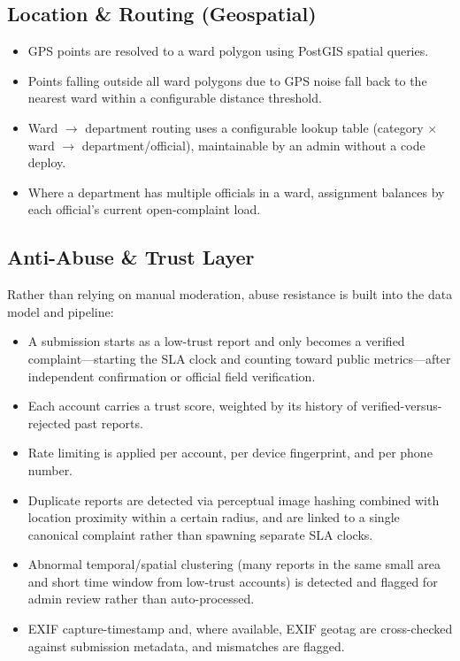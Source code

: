 \documentclass[12pt,a4paper]{article}
\begin{document}
\subsection{Location \& Routing (Geospatial)}

\begin{itemize}
    \item GPS points are resolved to a ward polygon using PostGIS spatial queries.
    \item Points falling outside all ward polygons due to GPS noise fall back to the nearest ward within a configurable distance threshold.
    \item Ward $\rightarrow$ department routing uses a configurable lookup table (category $\times$ ward $\rightarrow$ department/official), maintainable by an admin without a code deploy.
    \item Where a department has multiple officials in a ward, assignment balances by each official's current open-complaint load.
\end{itemize}

\subsection{Anti-Abuse \& Trust Layer}

Rather than relying on manual moderation, abuse resistance is built into the data model and pipeline:
\begin{itemize}
    \item A submission starts as a low-trust report and only becomes a verified complaint---starting the SLA clock and counting toward public metrics---after independent confirmation or official field verification.
    \item Each account carries a trust score, weighted by its history of verified-versus-rejected past reports.
    \item Rate limiting is applied per account, per device fingerprint, and per phone number.
    \item Duplicate reports are detected via perceptual image hashing combined with location proximity within a certain radius, and are linked to a single canonical complaint rather than spawning separate SLA clocks.
    \item Abnormal temporal/spatial clustering (many reports in the same small area and short time window from low-trust accounts) is detected and flagged for admin review rather than auto-processed.
    \item EXIF capture-timestamp and, where available, EXIF geotag are cross-checked against submission metadata, and mismatches are flagged.
\end{itemize}
\end{document}
